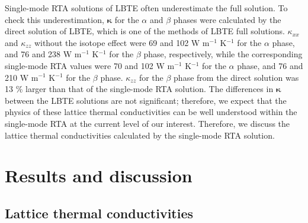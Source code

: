 \documentclass[twocolumn,amsmath,amssymb,a4paper,prb,superscriptaddress,floatfix]{revtex4-1}
\begin{document}
Single-mode RTA solutions of LBTE often underestimate the full
solution.\cite{mukhopadhyay-ltc,ward-ltc} To check this underestimation,
$\boldsymbol{\kappa}$ for the $\alpha$ and $\beta$ phases were calculated by the
direct solution of LBTE\cite{chaput-direct}, which is one of the methods of LBTE
full solutions. $\kappa_{xx}$ and $\kappa_{zz}$ without the isotope effect were
69 and 102 W m$^{-1}$ K$^{-1}$ for the $\alpha$ phase, and 76 and 238
W m$^{-1}$ K$^{-1}$ for the $\beta$ phase, respectively, while the corresponding
single-mode RTA values were 70 and 102 W m$^{-1}$ K$^{-1}$ for the $\alpha$ phase,
and 76 and 210 W m$^{-1}$ K$^{-1}$ for the $\beta$ phase. $\kappa_{zz}$ for the
$\beta$ phase from the direct solution was 13 \% larger than that of the
single-mode RTA solution. The differences in $\boldsymbol{\kappa}$ between the
LBTE solutions are not significant; therefore, we expect that the physics of
these lattice thermal conductivities can be well understood within the
single-mode RTA at the current level of our interest. Therefore, we discuss the
lattice thermal conductivities calculated by the single-mode RTA solution.

\section{Results and discussion}

\subsection{Lattice thermal conductivities}
\end{document}
